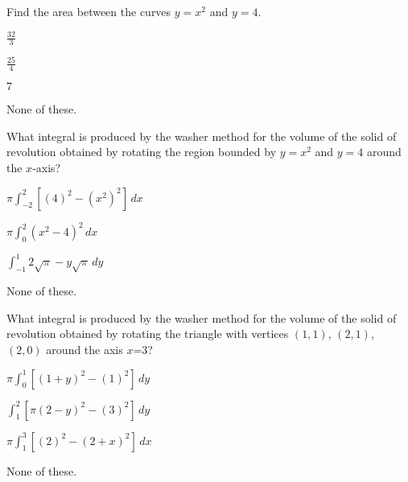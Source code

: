 \documentclass[12pt]{exam}
\newcommand{\<}{(}
\renewcommand{\>}{)}
\begin{document}
\begin{center}
\end{center}
\vspace{0.1in}

\vspace{12pt}

\begin{questions}\setcounter{question}{10}

\question
Find the area between the curves \(y=x^2\) and \(y=4\).
\begin{choices}
\item \(\frac{32}{3}\)
\item \(\frac{25}{4}\)
\item \(7\)
\item None of these.
\end{choices}

\question
What integral is produced by the washer method for the
volume of the solid of revolution obtained by rotating
the region bounded by \(y=x^2\) and \(y=4\) around the
\(x\)-axis?
\begin{choices}
\item \(\pi\int_{-2}^2[(4)^2-(x^2)^2]\,dx\)
\item \(\pi\int_0^2(x^2-4)^2\,dx\)
\item \(\int_{-1}^1 2\sqrt{\pi}-y\sqrt{\pi}\,dy\)
\item None of these.
\end{choices}

\question
What integral is produced by the washer method for the
volume of the solid of revolution obtained by rotating
the triangle with vertices \((1,1)\), \((2,1)\), \((2,0)\)
around the axis \(x\)=3?
\begin{choices}
\item \(\pi\int_0^1[(1+y)^2-(1)^2]\,dy\)
\item \(\int_1^2[\pi(2-y)^2-(3)^2]\,dy\)
\item \(\pi\int_1^3[(2)^2-(2+x)^2]\,dx\)
\item None of these.
\end{choices}




\end{questions}
\end{document}
